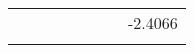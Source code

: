 \begin{tabular}{cccccccr}
                                                         &                    &                         &                         &                     &                           &                         & -2.4066               \\ \arrayrulecolor{table-color}\hline

\end{tabular}
